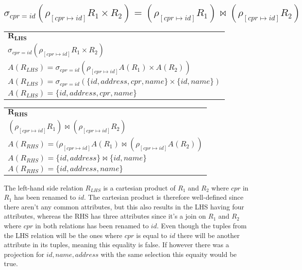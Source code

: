 \subsection{$\sigma_{cpr=id}(\rho_{[cpr \mapsto id]}R_1 \times R_2) = (\rho_{[cpr \mapsto id]}R_1) \Join (\rho_{[cpr \mapsto id]}R_2)$}

\begin{table}[ht]
	\begin{tabular}{l}
		 $\bm{R_{LHS}}$ \\
		 $\sigma_{cpr=id}(\rho_{[cpr \mapsto id]}R_1 \times R_2)$ \\
		 $A(R_{LHS}) = \sigma_{cpr=id}(\rho_{[cpr \mapsto id]}A(R_1) \times A(R_2))$ \\
		 $A(R_{LHS}) = \sigma_{cpr=id}(\{id, address, cpr, name\} \times \{id, name\})$ \\
		 $A(R_{LHS}) = \{id, address, cpr, name\}$
	\end{tabular}
\end{table}

\begin{table}[ht]
	\begin{tabular}{l}
		 $\bm{R_{RHS}}$ \\
		 $(\rho_{[cpr \mapsto id]}R_1) \Join (\rho_{[cpr \mapsto id]}R_2)$ \\
		 $A(R_{RHS}) = (\rho_{[cpr \mapsto id]}A(R_1) \Join (\rho_{[cpr \mapsto id]}A(R_2))$ \\
		 $A(R_{RHS}) = \{id, address\} \Join \{id, name\}$ \\
		 $A(R_{RHS}) = \{id, address, name\}$
	\end{tabular}
\end{table}
\FloatBarrier

The left-hand side relation $R_{LHS}$ is a cartesian product of $R_1$ and $R_2$ where $cpr$ in $R_1$ has been renamed to $id$.
The cartesian product is therefore well-defined since there aren't any common attributes, but this also results in the LHS having four attributes, whereas the RHS has three attributes since it's a join on $R_1$ and $R_2$ where $cpr$ in both relations has been renamed to $id$. Even though the tuples from the LHS relation will be the ones where $cpr$ is equal to $id$ there will be another attribute in its tuples, meaning this equality is false.
If however there was a projection for $id, name, address$ with the same selection this equaity would be true.\\\\

